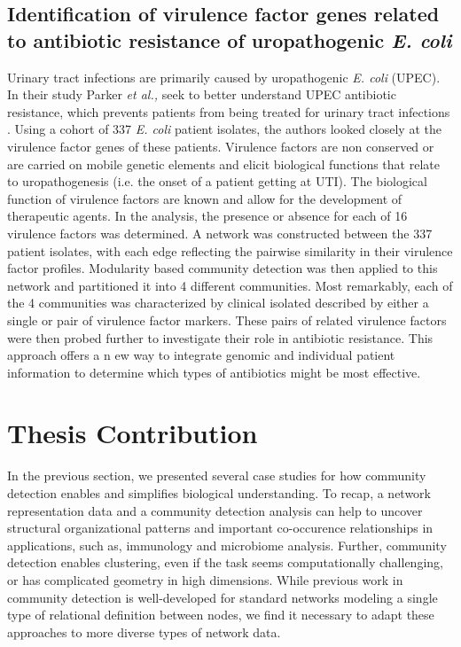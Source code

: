\subsection{Identification of virulence factor genes related to antibiotic resistance of uropathogenic \emph{E. coli}}
\indent Urinary tract infections are primarily caused by uropathogenic \emph{E. coli} (UPEC). In their study Parker \emph{et al.,} seek to better understand UPEC antibiotic resistance, which prevents patients from being treated for urinary tract infections \cite{parker2015network}. Using a cohort of 337 \emph{E. coli} patient isolates, the authors looked closely at the virulence factor genes of these patients. Virulence factors are non conserved or are carried on mobile genetic elements and elicit biological functions that relate to uropathogenesis (i.e. the onset of a patient getting at UTI). The biological function of virulence factors are known and allow for the development of therapeutic agents. In the analysis, the presence or absence for each of 16 virulence factors was determined. A network was constructed between the 337 patient isolates, with each edge reflecting the pairwise similarity in their virulence factor profiles. Modularity based community detection was then applied to this network and partitioned it into 4 different communities. Most remarkably, each of the 4 communities was characterized by clinical isolated described by either a single or pair of virulence factor markers. These pairs of related virulence factors were then probed further to investigate their role in antibiotic resistance. This approach offers a n ew way to integrate genomic and individual patient information to determine which types of antibiotics might be most effective.  

\section{Thesis Contribution}
In the previous section, we presented several case studies for how community detection enables and simplifies biological understanding. To recap, a network representation data and a community detection analysis can help to uncover structural organizational patterns and important co-occurence relationships in applications, such as, immunology and microbiome analysis. Further, community detection enables clustering, even if the task seems computationally challenging, or has complicated geometry in high dimensions. While previous work in community detection is well-developed for standard networks modeling a single type of relational definition between nodes, we find it necessary to adapt these approaches to more diverse types of network data.  

